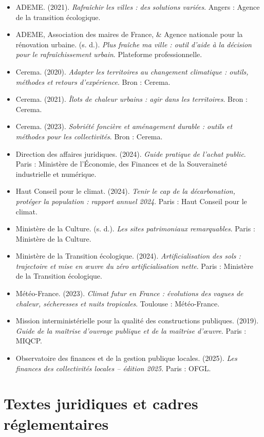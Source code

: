 \documentclass[11pt,a4paper]{report}
\begin{document}
\begin{itemize}
  \item ADEME. (2021). \emph{Rafraîchir les villes : des solutions variées}. Angers : Agence de la transition écologique.
  \item ADEME, Association des maires de France, \& Agence nationale pour la rénovation urbaine. (s. d.). \emph{Plus fraîche ma ville : outil d'aide à la décision pour le rafraîchissement urbain}. Plateforme professionnelle.
  \item Cerema. (2020). \emph{Adapter les territoires au changement climatique : outils, méthodes et retours d'expérience}. Bron : Cerema.
  \item Cerema. (2021). \emph{Îlots de chaleur urbains : agir dans les territoires}. Bron : Cerema.
  \item Cerema. (2023). \emph{Sobriété foncière et aménagement durable : outils et méthodes pour les collectivités}. Bron : Cerema.
  \item Direction des affaires juridiques. (2024). \emph{Guide pratique de l'achat public}. Paris : Ministère de l'Économie, des Finances et de la Souveraineté industrielle et numérique.
  \item Haut Conseil pour le climat. (2024). \emph{Tenir le cap de la décarbonation, protéger la population : rapport annuel 2024}. Paris : Haut Conseil pour le climat.
  \item Ministère de la Culture. (s. d.). \emph{Les sites patrimoniaux remarquables}. Paris : Ministère de la Culture.
  \item Ministère de la Transition écologique. (2024). \emph{Artificialisation des sols : trajectoire et mise en œuvre du zéro artificialisation nette}. Paris : Ministère de la Transition écologique.
  \item Météo-France. (2023). \emph{Climat futur en France : évolutions des vagues de chaleur, sécheresses et nuits tropicales}. Toulouse : Météo-France.
  \item Mission interministérielle pour la qualité des constructions publiques. (2019). \emph{Guide de la maîtrise d'ouvrage publique et de la maîtrise d'œuvre}. Paris : MIQCP.
  \item Observatoire des finances et de la gestion publique locales. (2025). \emph{Les finances des collectivités locales -- édition 2025}. Paris : OFGL.
\end{itemize}

\section*{Textes juridiques et cadres réglementaires}
\end{document}

